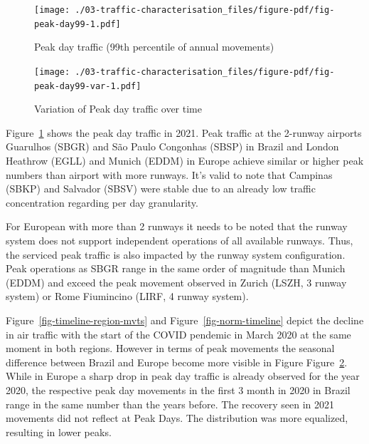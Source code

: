 \documentclass[
  a4paper,
  DIV=11,
  numbers=noendperiod]{scrreprt}
\begin{document}
\begin{figure}[h]

{\centering \texttt{[image: ./03-traffic-characterisation\_files/figure-pdf/fig-peak-day99-1.pdf]}

}

\caption{\label{fig-peak-day99}Peak day traffic (99th percentile of
annual movements)}

\end{figure}

\begin{figure}[h]

{\centering \texttt{[image: ./03-traffic-characterisation\_files/figure-pdf/fig-peak-day99-var-1.pdf]}

}

\caption{\label{fig-peak-day99-var}Variation of Peak day traffic over
time}

\end{figure}

Figure~\ref{fig-peak-day99} shows the peak day traffic in 2021. Peak
traffic at the 2-runway airports Guarulhos (SBGR) and São Paulo
Congonhas (SBSP) in Brazil and London Heathrow (EGLL) and Munich (EDDM)
in Europe achieve similar or higher peak numbers than airport with more
runways. It's valid to note that Campinas (SBKP) and Salvador (SBSV)
were stable due to an already low traffic concentration regarding per
day granularity.

For European with more than 2 runways it needs to be noted that the
runway system does not support independent operations of all available
runways. Thus, the serviced peak traffic is also impacted by the runway
system configuration. Peak operations as SBGR range in the same order of
magnitude than Munich (EDDM) and exceed the peak movement observed in
Zurich (LSZH, 3 runway system) or Rome Fiumincino (LIRF, 4 runway
system).

Figure~\ref{fig-timeline-region-mvts} and Figure~\ref{fig-norm-timeline}
depict the decline in air traffic with the start of the COVID pendemic
in March 2020 at the same moment in both regions. However in terms of
peak movements the seasonal difference between Brazil and Europe become
more visible in Figure Figure~\ref{fig-peak-day99-var}. While in Europe
a sharp drop in peak day traffic is already observed for the year 2020,
the respective peak day movements in the first 3 month in 2020 in Brazil
range in the same number than the years before. The recovery seen in
2021 movements did not reflect at Peak Days. The distribution was more
equalized, resulting in lower peaks.
\end{document}

